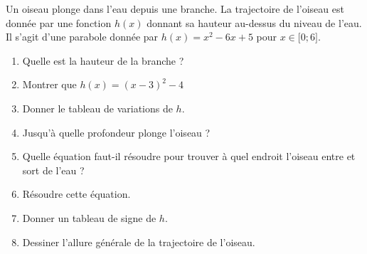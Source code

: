 
\begin{exercice}\label{exosmath-0658}

    Un oiseau plonge dans l'eau depuis une branche. La trajectoire de l'oiseau est donnée par une fonction \( h(x)\) donnant sa hauteur au-dessus du niveau de l'eau. Il s'agit d'une parabole donnée par \( h(x)=x^2-6x+5\) pour \( x\in\mathopen[ 0 ; 6 \mathclose]\).

    \begin{enumerate}
        \item
            Quelle est la hauteur de la branche ?
        \item
            Montrer que \( h(x)=(x-3)^2-4\)
        \item
            Donner le tableau de variations de \( h\).
        \item
            Jusqu'à quelle profondeur plonge l'oiseau ?
        \item
            Quelle équation faut-il résoudre pour trouver à quel endroit l'oiseau entre et sort de l'eau ?
        \item
            Résoudre cette équation.
        \item
            Donner un tableau de signe de \( h\).
        \item
            Dessiner l'allure générale de la trajectoire de l'oiseau.
    \end{enumerate}

\end{exercice}
